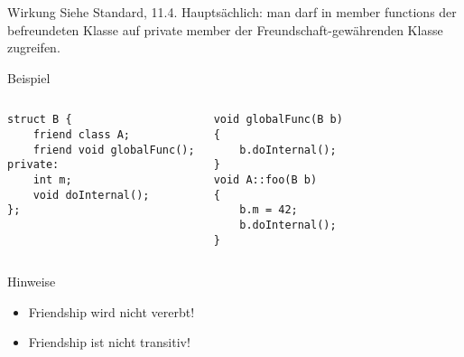 \begin{frame}[fragile]{Wirkung}
	Siehe Standard, 11.4.
	Hauptsächlich: man darf in member functions der befreundeten Klasse auf private member der Freundschaft-gewährenden Klasse zugreifen.
	
	\begin{block}{Beispiel}
		\begin{columns}[t]
			\begin{lstlisting}
struct B {
    friend class A;
    friend void globalFunc();
private:
    int m;
    void doInternal();
};
			\end{lstlisting}
			
			\begin{lstlisting}
void globalFunc(B b)
{
    b.doInternal();
}
void A::foo(B b)
{
    b.m = 42;
    b.doInternal();
}
			\end{lstlisting}
		\end{columns}
	\end{block}
\end{frame}


\begin{frame}{Hinweise}
	\begin{itemize}[<+->]
		\item Friendship wird nicht vererbt!
		\item Friendship ist nicht transitiv!
	\end{itemize}
\end{frame}
